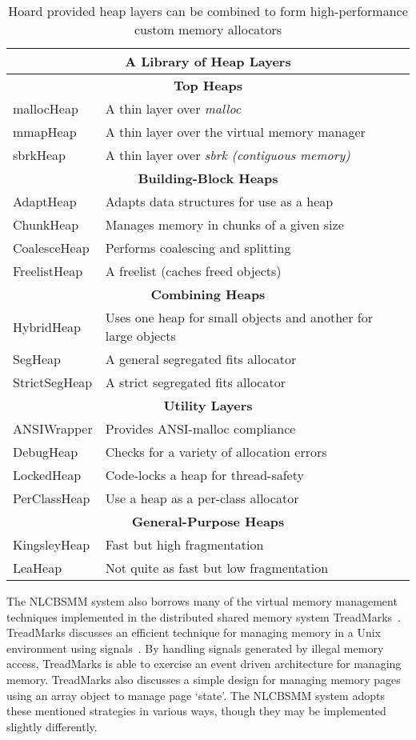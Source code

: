 \documentclass[9pt]{sig-alternate-10pt}
\begin{document}
% 
% 
%
\begin{table}[htb]
\begin{tabular}{|l p{5.8cm}|}
\hline
\multicolumn{2}{|c|}{\bf{A Library of Heap Layers}} \\
\hline
\multicolumn{2}{|c|}{\bf{Top Heaps}} \\
\hline
mallocHeap & A thin layer over \em malloc \em \\
mmapHeap & A thin layer over the virtual memory manager \\
sbrkHeap & A thin layer over \em sbrk \em (contiguous memory) \\
\hline
\multicolumn{2}{|c|}{\bf{Building-Block Heaps}} \\
\hline
AdaptHeap & Adapts data structures for use as a heap \\
ChunkHeap & Manages memory in chunks of a given size \\
CoalesceHeap & Performs coalescing and splitting \\
FreelistHeap & A freelist (caches freed objects) \\
\hline
\multicolumn{2}{|c|}{\bf{Combining Heaps}} \\
\hline
HybridHeap & Uses one heap for small objects and another for large objects \\
SegHeap & A general segregated fits allocator \\
StrictSegHeap & A strict segregated fits allocator \\
\hline
\multicolumn{2}{|c|}{\bf{Utility Layers}} \\
\hline
ANSIWrapper & Provides ANSI-malloc compliance \\
DebugHeap & Checks for a variety of allocation errors \\
LockedHeap & Code-locks a heap for thread-safety \\
PerClassHeap & Use a heap as a per-class allocator \\
\hline
\multicolumn{2}{|c|}{\bf{General-Purpose Heaps}} \\
\hline
KingsleyHeap & Fast but high fragmentation \\
LeaHeap & Not quite as fast but low fragmentation \\
\hline
\end{tabular}
\caption{Hoard provided heap layers can be combined to form high-performance custom memory allocators}
\end{table}


The NLCBSMM system also borrows many of the virtual memory management techniques implemented in the distributed shared memory system TreadMarks~\cite{treadmarks}.  TreadMarks discusses an efficient technique for managing memory in a Unix environment using signals~\cite{treadmarks}.  By handling signals generated by illegal memory access, TreadMarks is able to exercise an event driven architecture for managing memory.  TreadMarks also discusses a simple design for managing memory pages using an array object to manage page `state'.  The NLCBSMM system adopts these mentioned strategies in various ways, though they may be implemented slightly differently.
\end{document}
